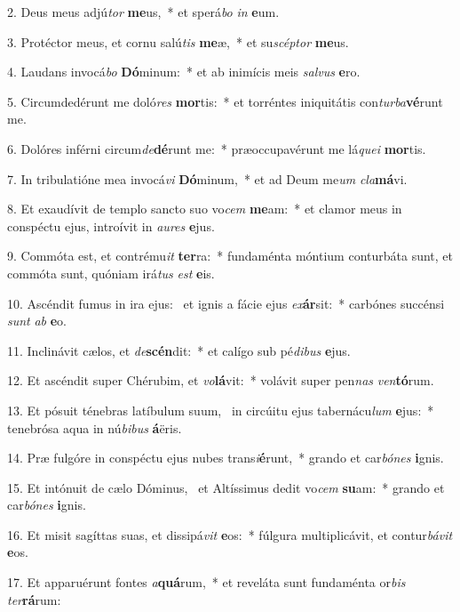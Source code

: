2. Deus meus adjú\textit{tor} \textbf{me}us,~*  et sperá\textit{bo} \textit{in} \textbf{e}um.\

3. Protéctor meus, et cornu salú\textit{tis} \textbf{me}æ,~*  et su\textit{scép}\textit{tor} \textbf{me}us.\

4. Laudans invocá\textit{bo} \textbf{Dó}minum:~*  et ab inimícis meis \textit{sal}\textit{vus} \textbf{e}ro.\

5. Circumdedérunt me doló\textit{res} \textbf{mor}tis:~*  et torréntes iniquitátis con\textit{tur}\textit{ba}\textbf{vé}runt me.\

6. Dolóres inférni circum\textit{de}\textbf{dé}runt me:~*  præoccupavérunt me lá\textit{que}\textit{i} \textbf{mor}tis.\

7. In tribulatióne mea invocá\textit{vi} \textbf{Dó}minum,~*  et ad Deum me\textit{um} \textit{cla}\textbf{má}vi.\

8. Et exaudívit de templo sancto suo vo\textit{cem} \textbf{me}am:~*  et clamor meus in conspéctu ejus, introívit in \textit{au}\textit{res} \textbf{e}jus.\

9. Commóta est, et contrému\textit{it} \textbf{ter}ra:~*  fundaménta móntium conturbáta sunt, et commóta sunt, quóniam irá\textit{tus} \textit{est} \textbf{e}is.\

10. Ascéndit fumus in ira ejus: \dag\  et ignis a fácie ejus \textit{ex}\textbf{ár}sit:~*  carbónes succénsi \textit{sunt} \textit{ab} \textbf{e}o.\

11. Inclinávit cælos, et \textit{de}\textbf{scén}dit:~*  et calígo sub pé\textit{di}\textit{bus} \textbf{e}jus.\

12. Et ascéndit super Chérubim, et \textit{vo}\textbf{lá}vit:~*  volávit super pen\textit{nas} \textit{ven}\textbf{tó}rum.\

13. Et pósuit ténebras latíbulum suum, \dag\  in circúitu ejus tabernácu\textit{lum} \textbf{e}jus:~*  tenebrósa aqua in nú\textit{bi}\textit{bus} \textbf{á}ëris.\

14. Præ fulgóre in conspéctu ejus nubes trans\textit{i}\textbf{é}runt,~*  grando et car\textit{bó}\textit{nes} \textbf{i}gnis.\

15. Et intónuit de cælo Dóminus, \dag\  et Altíssimus dedit vo\textit{cem} \textbf{su}am:~*  grando et car\textit{bó}\textit{nes} \textbf{i}gnis.\

16. Et misit sagíttas suas, et dissipá\textit{vit} \textbf{e}os:~*  fúlgura multiplicávit, et contur\textit{bá}\textit{vit} \textbf{e}os.\

17. Et apparuérunt fontes \textit{a}\textbf{quá}rum,~*  et reveláta sunt fundaménta or\textit{bis} \textit{ter}\textbf{rá}rum:\

